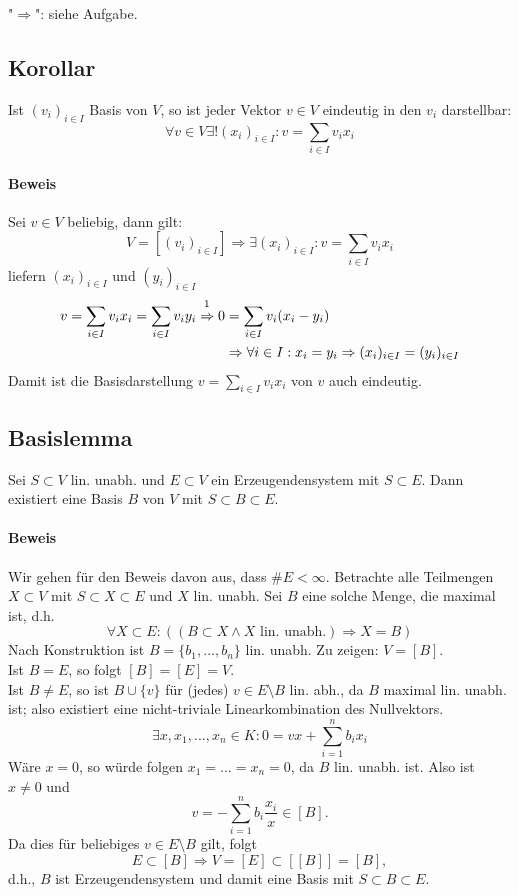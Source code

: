 	"$\Rightarrow$": siehe Aufgabe.
	
\subsection{Korollar}
	\begin{Korollar}
		Ist $(v_i)_{i\in I}$ Basis von $ V $, so ist jeder Vektor $v\in V$ eindeutig in den $v_i$ darstellbar:
		\[\forall v\in V \exists! (x_i)_{i\in I}: v = \sum_{i\in I} v_ix_i\]
	\end{Korollar}

\paragraph{Beweis}
	Sei $v\in V$ beliebig, dann gilt:
		\[V = [(v_i)_{i\in I}] \Rightarrow \exists (x_i)_{i\in I}: v = \sum_{i\in I} v_ix_i\]
	liefern $(x_i)_{i\in I}$ und $(y_i)_{i\in I}$
	\begin{align*}
		v = \sum_{i\in I} v_ix_i = \sum_{i\in I}v_iy_i \stackrel{\footnotemark}{\Rightarrow} 0 &= \sum_{i\in I} v_i(x_i-y_i)\\
                &\Rightarrow \forall i\in I: x_i = y_i \Rightarrow (x_i)_{i\in I} = (y_i)_{i\in I}
	\end{align*}
	Damit ist die Basisdarstellung $v = \sum_{i\in I} v_ix_i$ von $v$ auch eindeutig.

\subsection{Basislemma}
    \begin{Lemma}[Basislemma]
    	Sei $S\subset V$ lin. unabh. und $E\subset V$ ein Erzeugendensystem mit $S\subset E$. Dann existiert eine Basis $B$ von $V$ mit $S\subset B\subset E$.
    \end{Lemma}

\paragraph{Beweis}
    Wir gehen für den Beweis davon aus, dass $\#E<\infty$. Betrachte alle Teilmengen $X\subset V$ mit $S\subset X\subset E$ und $X$ lin. unabh. Sei $B$ eine solche Menge, die maximal ist, d.h.
        \[\forall X\subset E: ((B\subset X\land X\text{ lin. unabh.}) \Rightarrow X= B)\]
    Nach Konstruktion ist $B=\{b_1,...,b_n\}$ lin. unabh. Zu zeigen: $V=[B]$.\\
    Ist $B=E$, so folgt $[B]=[E]=V$.\\
    Ist $B\neq E$, so ist $B\cup \{v\} $ für (jedes) $v\in E\setminus B$ lin. abh., da $B$ maximal lin. unabh. ist; also existiert eine nicht-triviale Linearkombination des Nullvektors.
        \[\exists x,x_1,...,x_n \in K: 0=vx+\sum^n_{i=1}b_ix_i\]
    Wäre $x=0$, so würde folgen $x_1=...=x_n=0$, da $B$ lin. unabh. ist. 
    Also ist $x\neq 0$ und 
    	\[v=-\sum^n_{i=1} b_i\frac{x_i}{x} \in [B].\]
    Da dies für beliebiges $v\in E\setminus B$ gilt, folgt
    	\[E\subset [B] \Rightarrow V=[E]\subset [[B]] = [B],\]
    d.h., $ B $ ist Erzeugendensystem und damit eine Basis mit $S\subset B\subset E$.

